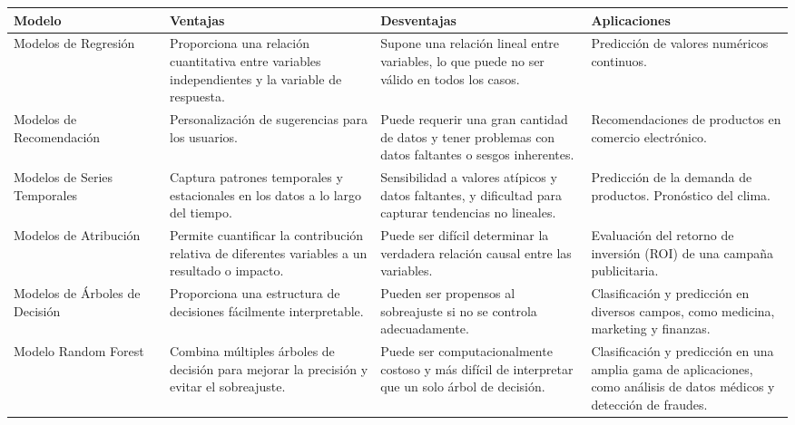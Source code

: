 \begin{table}[ht]
\captionsetup{font=small} %
\small %
\begin{tabular}{|p{0.2\linewidth}|p{0.27\linewidth}|p{0.27\linewidth}|p{0.26\linewidth}|}
\hline
\textbf{Modelo} & \textbf{Ventajas} & \textbf{Desventajas} & \textbf{Aplicaciones} \\
\hline
Modelos de Regresión & 
Proporciona una relación cuantitativa entre variables independientes y la variable de respuesta. & 
Supone una relación lineal entre variables, lo que puede no ser válido en todos los casos. & 
Predicción de valores numéricos continuos. \\
\hline
Modelos de Recomendación & 
Personalización de sugerencias para los usuarios. & 
Puede requerir una gran cantidad de datos y tener problemas con datos faltantes o sesgos inherentes. & 
Recomendaciones de productos en comercio electrónico. \\
\hline
Modelos de Series Temporales & 
Captura patrones temporales y estacionales en los datos a lo largo del tiempo. & 
Sensibilidad a valores atípicos y datos faltantes, y dificultad para capturar tendencias no lineales. & 
Predicción de la demanda de productos. Pronóstico del clima. \\
\hline
Modelos de Atribución & 
Permite cuantificar la contribución relativa de diferentes variables a un resultado o impacto. & 
Puede ser difícil determinar la verdadera relación causal entre las variables. & 
Evaluación del retorno de inversión (ROI) de una campaña publicitaria. \\
\hline
Modelos de Árboles de Decisión & 
Proporciona una estructura de decisiones fácilmente interpretable. & 
Pueden ser propensos al sobreajuste si no se controla adecuadamente. & 
Clasificación y predicción en diversos campos, como medicina, marketing y finanzas. \\
\hline
Modelo Random Forest & 
Combina múltiples árboles de decisión para mejorar la precisión y evitar el sobreajuste. & 
Puede ser computacionalmente costoso y más difícil de interpretar que un solo árbol de decisión. & 
Clasificación y predicción en una amplia gama de aplicaciones, como análisis de datos médicos y detección de fraudes. \\
\hline
\end{tabular}
\end{table}
